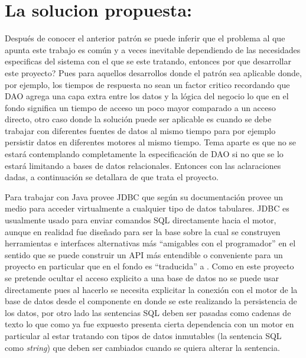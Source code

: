 \section{La solucion propuesta: \jj}
Después de conocer el anterior patrón se puede inferir que el problema al que apunta este trabajo es común y a veces inevitable dependiendo de las necesidades especificas del sistema con el que se este tratando, entonces por que desarrollar este proyecto? Pues para aquellos desarrollos donde el patrón sea aplicable donde, por ejemplo, los tiempos de respuesta no sean un factor critico recordando que DAO agrega una capa extra entre los datos y la lógica del negocio lo que en el fondo significa un tiempo de acceso un poco mayor comparado a un acceso directo, otro caso donde la solución puede ser aplicable es cuando se debe trabajar con diferentes fuentes de datos al mismo tiempo para por ejemplo persistir datos en diferentes motores al mismo tiempo. Tema aparte es que no se estará contemplando completamente la especificación de DAO si no que se lo estará limitando a bases de datos relacionales. Entonces con las aclaraciones dadas, a continuación se detallara de que trata el proyecto.

Para trabajar con \dd Java provee JDBC\cite{java:jdbc} que según su documentación provee un medio para acceder virtualmente a cualquier tipo de datos tabulares. JDBC es usualmente usado para enviar comandos SQL directamente hacia el motor, aunque en realidad fue diseñado para ser la base sobre la cual se construyen herramientas e interfaces alternativas más ``amigables con el programador'' en el sentido que se puede construir un API más entendible o conveniente para un proyecto en particular que en el fondo es ``traducida'' a \jd. Como en este proyecto se pretende ocultar el acceso explicito a una base de datos no se puede usar directamente \jd pues al hacerlo se necesita explicitar la conexión con el motor de la base de datos desde el componente en donde se este realizando la persistencia de los datos, por otro lado las sentencias SQL deben ser pasadas como cadenas de texto lo que como ya fue expuesto presenta cierta dependencia con un motor en particular al estar tratando con tipos de datos inmutables (la sentencia SQL como \textit{string}) que deben ser cambiados cuando se quiera alterar la sentencia.

